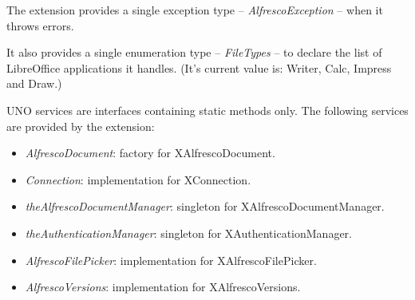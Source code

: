 The extension provides a single exception type -- \emph{AlfrescoException} --
when it throws errors.

It also provides a single enumeration type -- \emph{FileTypes} -- to declare
the list of LibreOffice applications it handles. (It's current value is:
Writer, Calc, Impress and Draw.)

UNO services are interfaces containing static methods only.  The following
services are provided by the extension:

\begin{itemize}
\item \emph{AlfrescoDocument}: factory for XAlfrescoDocument.
\item \emph{Connection}: implementation for XConnection.
\item \emph{theAlfrescoDocumentManager}: singleton for XAlfrescoDocumentManager.
\item \emph{theAuthenticationManager}: singleton for XAuthenticationManager.
\item \emph{AlfrescoFilePicker}: implementation for XAlfrescoFilePicker.
\item \emph{AlfrescoVersions}: implementation for XAlfrescoVersions.
\end{itemize}
